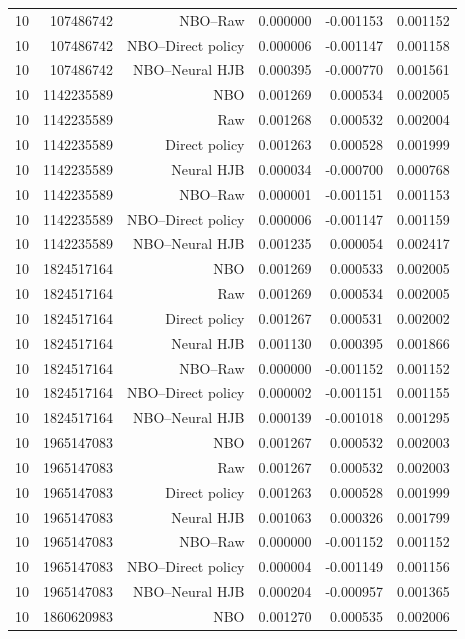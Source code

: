 \begin{longtable}{lrrrrr}
10 & 107486742 & NBO--Raw & 0.000000 & -0.001153 & 0.001152 \\
10 & 107486742 & NBO--Direct policy & 0.000006 & -0.001147 & 0.001158 \\
10 & 107486742 & NBO--Neural HJB & 0.000395 & -0.000770 & 0.001561 \\
10 & 1142235589 & NBO & 0.001269 & 0.000534 & 0.002005 \\
10 & 1142235589 & Raw & 0.001268 & 0.000532 & 0.002004 \\
10 & 1142235589 & Direct policy & 0.001263 & 0.000528 & 0.001999 \\
10 & 1142235589 & Neural HJB & 0.000034 & -0.000700 & 0.000768 \\
10 & 1142235589 & NBO--Raw & 0.000001 & -0.001151 & 0.001153 \\
10 & 1142235589 & NBO--Direct policy & 0.000006 & -0.001147 & 0.001159 \\
10 & 1142235589 & NBO--Neural HJB & 0.001235 & 0.000054 & 0.002417 \\
10 & 1824517164 & NBO & 0.001269 & 0.000533 & 0.002005 \\
10 & 1824517164 & Raw & 0.001269 & 0.000534 & 0.002005 \\
10 & 1824517164 & Direct policy & 0.001267 & 0.000531 & 0.002002 \\
10 & 1824517164 & Neural HJB & 0.001130 & 0.000395 & 0.001866 \\
10 & 1824517164 & NBO--Raw & 0.000000 & -0.001152 & 0.001152 \\
10 & 1824517164 & NBO--Direct policy & 0.000002 & -0.001151 & 0.001155 \\
10 & 1824517164 & NBO--Neural HJB & 0.000139 & -0.001018 & 0.001295 \\
10 & 1965147083 & NBO & 0.001267 & 0.000532 & 0.002003 \\
10 & 1965147083 & Raw & 0.001267 & 0.000532 & 0.002003 \\
10 & 1965147083 & Direct policy & 0.001263 & 0.000528 & 0.001999 \\
10 & 1965147083 & Neural HJB & 0.001063 & 0.000326 & 0.001799 \\
10 & 1965147083 & NBO--Raw & 0.000000 & -0.001152 & 0.001152 \\
10 & 1965147083 & NBO--Direct policy & 0.000004 & -0.001149 & 0.001156 \\
10 & 1965147083 & NBO--Neural HJB & 0.000204 & -0.000957 & 0.001365 \\
10 & 1860620983 & NBO & 0.001270 & 0.000535 & 0.002006 \\

\end{longtable}
